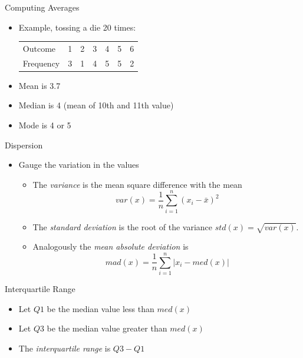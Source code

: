 \documentclass{beamer}
\begin{document}
\begin{frame}{Computing Averages} 
 \begin{itemize} 
  \item Example, tossing a die 20 times: 
\begin{table}
  \begin{tabular}{l | l l l l l l }
\hline 
  Outcome & 1 & 2 & 3 & 4 & 5 & 6 \\ 
  Frequency & 3 & 1 & 4 & 5 & 5 & 2 \\
\hline 
  \end{tabular} 
\end{table}
  \item Mean is 3.7 
  \item Median is 4 (mean of 10th and 11th value)
  \item Mode is 4 or 5 
 \end{itemize}
\end{frame}

\begin{frame}{Dispersion}  
\begin{itemize} 
 \item Gauge the variation in the values 
\begin{itemize} 
\item The \emph{variance} is the mean square difference with the mean 
\begin{displaymath} 
 var(x) = \frac{1}{n}\sum_{i=1}^n (x_i - \bar{x})^2
\end{displaymath}
 \item The \emph{standard deviation} is the root of the variance $std(x) = \sqrt{var(x)}$. 
\item Analogously the \emph{mean absolute deviation} is 
\begin{displaymath} 
  mad(x) = \frac{1}{n}\sum_{i=1}^n |x_i - med(x)|
\end{displaymath}
\end{itemize}
\end{itemize}
\end{frame}

\begin{frame}{Interquartile Range} 
 \begin{itemize} 
  \item Let $Q1$ be the median value less than $med(x)$ 
  \item Let $Q3$ be the median value greater than $med(x)$
  \item The \emph{interquartile range} is $Q3 - Q1$ 
 \end{itemize}
\end{frame}
\end{document}
